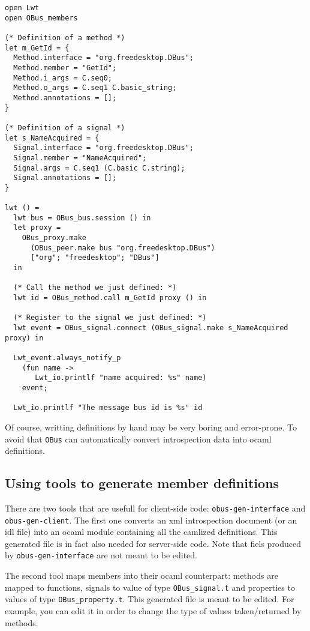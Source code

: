 \documentclass{article}
\newcommand{\obus}{\texttt{OBus}\xspace}
\begin{document}
\lstset{language=[Objective]Caml}
\begin{lstlisting}
open Lwt
open OBus_members

(* Definition of a method *)
let m_GetId = {
  Method.interface = "org.freedesktop.DBus";
  Method.member = "GetId";
  Method.i_args = C.seq0;
  Method.o_args = C.seq1 C.basic_string;
  Method.annotations = [];
}

(* Definition of a signal *)
let s_NameAcquired = {
  Signal.interface = "org.freedesktop.DBus";
  Signal.member = "NameAcquired";
  Signal.args = C.seq1 (C.basic C.string);
  Signal.annotations = [];
}

lwt () =
  lwt bus = OBus_bus.session () in
  let proxy =
    OBus_proxy.make
      (OBus_peer.make bus "org.freedesktop.DBus")
      ["org"; "freedesktop"; "DBus"]
  in

  (* Call the method we just defined: *)
  lwt id = OBus_method.call m_GetId proxy () in

  (* Register to the signal we just defined: *)
  lwt event = OBus_signal.connect (OBus_signal.make s_NameAcquired proxy) in

  Lwt_event.always_notify_p
    (fun name ->
       Lwt_io.printlf "name acquired: %s" name)
    event;

  Lwt_io.printlf "The message bus id is %s" id
\end{lstlisting}

Of course, writting definitions by hand may be very boring and
error-prone. To avoid that \obus can automatically convert
introspection data into ocaml definitions.

\subsection{Using tools to generate member definitions}

There are two tools that are usefull for client-side code:
\texttt{obus-gen-interface} and \texttt{obus-gen-client}. The first
one converts an xml introspection document (or an idl file) into an
ocaml module containing all the camlized definitions. This generated
file is in fact also needed for server-side code. Note that fiels
produced by \texttt{obus-gen-interface} are not meant to be edited.

The second tool maps members into their ocaml counterpart: methods are
mapped to functions, signals to value of type \texttt{OBus\_signal.t}
and properties to values of type \texttt{OBus\_property.t}.  This
generated file is meant to be edited. For example, you can edit it in
order to change the type of values taken/returned by methods.
\end{document}
